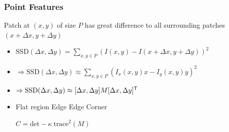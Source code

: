 \subsubsection{Point Features}
\begin{itemize}
     Patch at $(x,y)$ of size $P$ has great difference to all surrounding patches $(x + \Delta x, y + \Delta y)$
        \begin{itemize}
            \item $\mathrm{SSD}(\Delta x, \Delta y) = \sum_{x,y \in P}(I(x,y) - I(x + \Delta x, y + \Delta y))^2$
            \item $\Rightarrow \mathrm{SSD}(\Delta x, \Delta y) \approx \sum_{x,y \in P}(I_x(x,y)x - I_y(x, y)y)^2$
                \\ 
            \item $\Rightarrow \mathrm{SSD}(\Delta x, \Delta y) \approx [\Delta x, \Delta y]M[\Delta x, \Delta y]^{\mathsf{T}}$
                \\ 
            \item \begin{itemize*}
                 Flat region
                 Edge
                 Edge
                 Corner
            \end{itemize*}
             $C = \text{det} - \kappa \ \text{trace}^2(M)$

\end{itemize}
\end{itemize}
